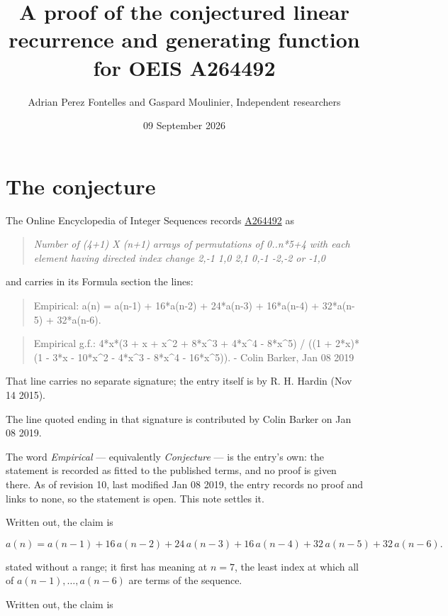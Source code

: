 \documentclass[11pt]{article}
\title{A proof of the conjectured linear recurrence and generating function for OEIS A264492}
\author{Adrian Perez Fontelles and Gaspard Moulinier, Independent researchers}
\date{09 September 2026}
\theoremstyle{definition}
\begin{document}
\maketitle
\section{The conjecture}

The Online Encyclopedia of Integer Sequences records \href{https://oeis.org/A264492}{A264492} as

\begin{quote}\itshape Number of (4+1) X (n+1) arrays of permutations of 0..n*5+4 with each element having directed index change 2,-1 1,0 2,1 0,-1 -2,-2 or -1,0\end{quote}

and carries in its Formula section the lines:

\begin{quote}\ttfamily Empirical: a(n) = a(n-1) + 16*a(n-2) + 24*a(n-3) + 16*a(n-4) + 32*a(n-5) + 32*a(n-6).\end{quote}

\begin{quote}\ttfamily Empirical g.f.: 4*x*(3 + x + x\textasciicircum{}2 + 8*x\textasciicircum{}3 + 4*x\textasciicircum{}4 - 8*x\textasciicircum{}5) / ((1 + 2*x)*(1 - 3*x - 10*x\textasciicircum{}2 - 4*x\textasciicircum{}3 - 8*x\textasciicircum{}4 - 16*x\textasciicircum{}5)). - Colin Barker, Jan 08 2019\end{quote}

That line carries no separate signature; the entry itself is by R. H. Hardin (Nov 14 2015).

The line quoted ending in that signature is contributed by Colin Barker on Jan 08 2019.

The word {\itshape Empirical} --- equivalently {\itshape Conjecture} --- is the entry's own: the statement is recorded as fitted to the published terms, and no proof is given there. As of revision 10, last modified Jan 08 2019, the entry records no proof and links to none, so the statement is open. This note settles it.

Written out, the claim is

\[a(n) = a(n-1) + 16\,a(n-2) + 24\,a(n-3) + 16\,a(n-4) + 32\,a(n-5) + 32\,a(n-6).\]

stated without a range; it first has meaning at $n = 7$, the least index at which all of $a(n-1),\dots,a(n-6)$ are terms of the sequence.

Written out, the claim is
\end{document}
